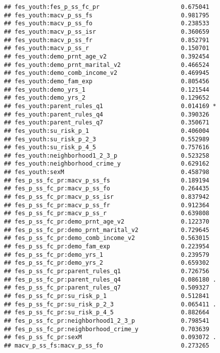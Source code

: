 \documentclass[
]{article}
\begin{document}
\begin{verbatim}
## fes_youth:fes_p_ss_fc_pr                       0.675041    
## fes_youth:macv_p_ss_fs                         0.981795    
## fes_youth:macv_p_ss_fo                         0.238533    
## fes_youth:macv_p_ss_isr                        0.360659    
## fes_youth:macv_p_ss_fr                         0.852791    
## fes_youth:macv_p_ss_r                          0.150701    
## fes_youth:demo_prnt_age_v2                     0.392454    
## fes_youth:demo_prnt_marital_v2                 0.466524    
## fes_youth:demo_comb_income_v2                  0.469945    
## fes_youth:demo_fam_exp                         0.805456    
## fes_youth:demo_yrs_1                           0.121544    
## fes_youth:demo_yrs_2                           0.129652    
## fes_youth:parent_rules_q1                      0.014169 *  
## fes_youth:parent_rules_q4                      0.390326    
## fes_youth:parent_rules_q7                      0.350671    
## fes_youth:su_risk_p_1                          0.406004    
## fes_youth:su_risk_p_2_3                        0.552989    
## fes_youth:su_risk_p_4_5                        0.757616    
## fes_youth:neighborhood1_2_3_p                  0.523258    
## fes_youth:neighborhood_crime_y                 0.629162    
## fes_youth:sexM                                 0.458798    
## fes_p_ss_fc_pr:macv_p_ss_fs                    0.189194    
## fes_p_ss_fc_pr:macv_p_ss_fo                    0.264435    
## fes_p_ss_fc_pr:macv_p_ss_isr                   0.837942    
## fes_p_ss_fc_pr:macv_p_ss_fr                    0.912364    
## fes_p_ss_fc_pr:macv_p_ss_r                     0.639808    
## fes_p_ss_fc_pr:demo_prnt_age_v2                0.122370    
## fes_p_ss_fc_pr:demo_prnt_marital_v2            0.729645    
## fes_p_ss_fc_pr:demo_comb_income_v2             0.563015    
## fes_p_ss_fc_pr:demo_fam_exp                    0.223954    
## fes_p_ss_fc_pr:demo_yrs_1                      0.239579    
## fes_p_ss_fc_pr:demo_yrs_2                      0.659302    
## fes_p_ss_fc_pr:parent_rules_q1                 0.726756    
## fes_p_ss_fc_pr:parent_rules_q4                 0.086180 .  
## fes_p_ss_fc_pr:parent_rules_q7                 0.509327    
## fes_p_ss_fc_pr:su_risk_p_1                     0.512841    
## fes_p_ss_fc_pr:su_risk_p_2_3                   0.065411 .  
## fes_p_ss_fc_pr:su_risk_p_4_5                   0.882664    
## fes_p_ss_fc_pr:neighborhood1_2_3_p             0.798541    
## fes_p_ss_fc_pr:neighborhood_crime_y            0.703639    
## fes_p_ss_fc_pr:sexM                            0.093072 .  
## macv_p_ss_fs:macv_p_ss_fo                      0.273265    

\end{verbatim}
\end{document}
